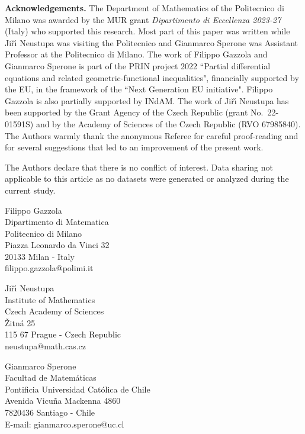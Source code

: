 \documentclass[a4paper,11pt]{article}
\numberwithin{equation}{section}
\numberwithin{figure}{section}
\begin{document}
\bigskip\noindent
{\bf Acknowledgements.} The Department of Mathematics of the Politecnico di Milano was awarded by the MUR grant
{\em Dipartimento di Eccellenza 2023-27} (Italy) who supported this research. Most part of this paper was written while
Ji\v{r}\'{\i} Neustupa was visiting the Politecnico and Gianmarco Sperone was Assistant Professor at the Politecnico di Milano.
The work of Filippo Gazzola and Gianmarco Sperone is part of the PRIN project 2022 ``Partial differential equations and related
geometric-functional inequalities", financially supported by the EU, in the framework of the
``Next Generation EU initiative". Filippo Gazzola is also partially supported by INdAM. The work of Ji\v{r}\'{\i} Neustupa has been supported by the
Grant Agency of the Czech Republic (grant No.~22-01591S) and by the
Academy of Sciences of the Czech Republic (RVO 67985840). The Authors warmly thank the anonymous Referee for
careful proof-reading and for several suggestions that led to an improvement of the present work.\par
The Authors declare that there is no conflict of interest. Data sharing not applicable to this article as no datasets were generated or analyzed during the current study.

\newpage
{}
{}


\vspace{5mm}
{\small
\begin{minipage}{56mm}
	Filippo Gazzola\\
	Dipartimento di Matematica\\
	Politecnico di Milano\\
	Piazza Leonardo da Vinci 32\\
	20133 Milan - Italy\\
	filippo.gazzola@polimi.it
\end{minipage}
\begin{minipage}{56mm}
	Ji\v{r}\'{\i} Neustupa\\
	Institute of Mathematics\\
	Czech Academy of Sciences\\
	\v{Z}itn\'{a} 25\\
	115 67 Prague - Czech Republic\\
	neustupa@math.cas.cz
\end{minipage}
\begin{minipage}{65mm}
	Gianmarco Sperone\\
Facultad de Matemáticas\\
Pontificia Universidad Católica de Chile\\
Avenida Vicuña Mackenna 4860\\
7820436 Santiago - Chile\\
E-mail: gianmarco.sperone@uc.cl
\end{minipage}
}
\end{document}
